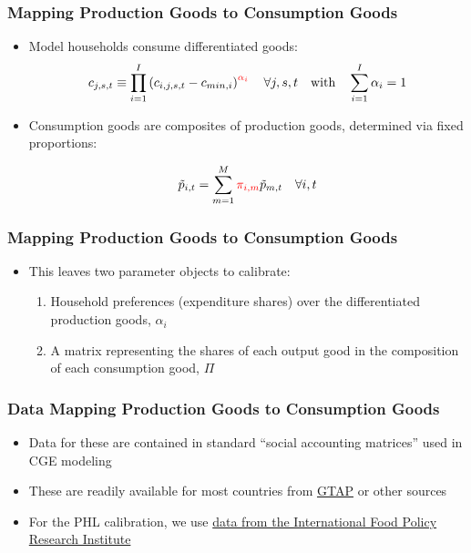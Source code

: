 \documentclass{beamer}
\begin{document}
\begin{frame}
  \frametitle{Mapping Production Goods to Consumption Goods}
  \begin{itemize}
    \item Model households consume differentiated goods:
      \begin{equation*}
        c_{j,s,t} \equiv \prod_{i=1}^I \left(c_{i,j,s,t} - c_{min,i}\right)^{\textcolor{red}{\alpha_i}} \quad\forall j,s,t \quad\text{with}\quad \sum_{i=1}^I\alpha_i=1
      \end{equation*}

      \item Consumption goods are composites of production goods, determined via fixed proportions:

      \begin{equation*}
        \tilde{p}_{i,t} = \sum_{m=1}^M \textcolor{red}{\pi_{i,m}}\tilde{p}_{m,t} \quad\forall i,t
      \end{equation*}
    \end{itemize}
  \end{frame}

  \begin{frame}
    \frametitle{Mapping Production Goods to Consumption Goods}
    \begin{itemize}
      \item This leaves two parameter objects to calibrate:
          \begin{enumerate}
              \item Household preferences (expenditure shares) over the differentiated production goods, $\alpha_i$
              \item A matrix representing the shares of each output good in the composition of each consumption good, $\Pi$
          \end{enumerate}
  \end{itemize}
\end{frame}


\begin{frame}
  \frametitle{Data Mapping Production Goods to Consumption Goods}
  \begin{itemize}
      \item Data for these are contained in standard ``social accounting matrices'' used in CGE modeling
      \item These are readily available for most countries from \href{https://www.gtap.agecon.purdue.edu}{GTAP} or other sources
      \item For the PHL calibration, we use \href{https://dataverse.harvard.edu/file.xhtml?fileId=5617690&version=1.0}{data from the International Food Policy Research Institute}
  \end{itemize}
\end{frame}
\end{document}
